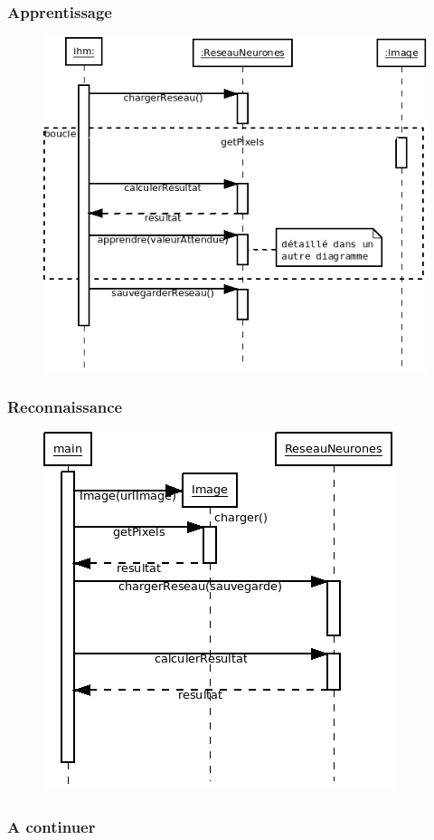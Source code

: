 		\subsubsection{Apprentissage}
\begin{figure}[H]                                                                                                    
        \centering                                                                                                   
        \includegraphics[width=0.6\linewidth]{diag/seq_apprentissage.png}                                                  
\end{figure}

		\subsubsection{Reconnaissance}
\begin{figure}[H]                                                                                                    
        \centering                                                                                                   
        \includegraphics[width=0.6\linewidth]{diag/seq_reconnaissance.png}                                                  
\end{figure}

		\subsubsection{A continuer}